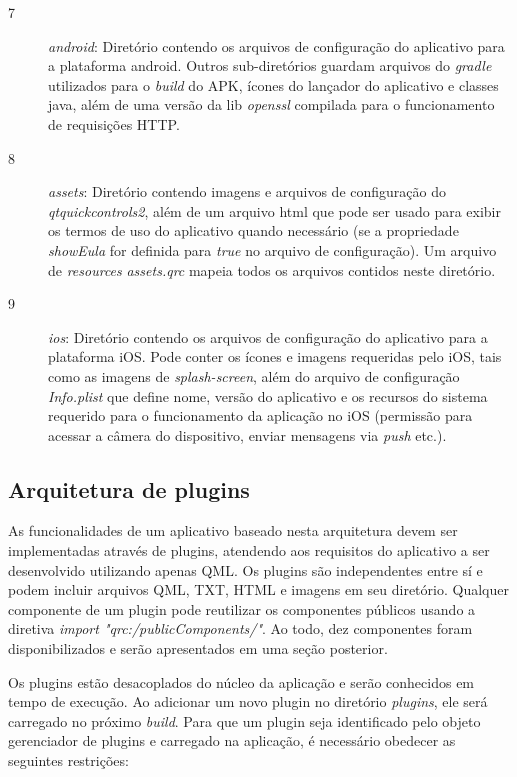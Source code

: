 \begin{description}
	\item[7] \textit{android}: Diretório contendo os arquivos de configuração do aplicativo para a plataforma android. Outros sub-diretórios guardam arquivos do \textit{gradle} utilizados para o \textit{build} do APK, ícones do lançador do aplicativo e classes java, além de uma versão da lib \textit{openssl} compilada para o funcionamento de requisições HTTP.

	\item[8] \textit{assets}: Diretório contendo imagens e arquivos de configuração do \textit{qtquickcontrols2}, além de um arquivo html que pode ser usado para exibir os termos de uso do aplicativo quando necessário (se a propriedade \textit{showEula} for definida para \textit{true} no arquivo de configuração). Um arquivo de \textit{resources} \textit{assets.qrc} mapeia todos os arquivos contidos neste diretório.

	\item[9] \textit{ios}: Diretório contendo os arquivos de configuração do aplicativo para a plataforma iOS. Pode conter os ícones e imagens requeridas pelo iOS, tais como as imagens de \textit{splash-screen}, além do arquivo de configuração \textit{Info.plist} que define nome, versão do aplicativo e os recursos do sistema requerido para o funcionamento da aplicação no iOS (permissão para acessar a câmera do dispositivo, enviar mensagens via \textit{push} etc.).
\end{description}


\subsection{Arquitetura de plugins}
As funcionalidades de um aplicativo baseado nesta arquitetura devem ser implementadas através de plugins, atendendo aos requisitos do aplicativo a ser desenvolvido utilizando apenas QML. Os plugins são independentes entre sí e podem incluir arquivos QML, TXT, HTML e imagens em seu diretório. Qualquer componente de um plugin pode reutilizar os componentes públicos usando a diretiva \textit{import "qrc:/publicComponents/"}. Ao todo, dez componentes foram disponibilizados e serão apresentados em uma seção posterior.\par

Os plugins estão desacoplados do núcleo da aplicação e serão conhecidos em tempo de execução. Ao adicionar um novo plugin no diretório \textit{plugins}, ele será carregado no próximo \textit{build}. Para que um plugin seja identificado pelo objeto gerenciador de plugins e carregado na aplicação, é necessário obedecer as seguintes restrições:

